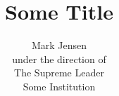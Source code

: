 \documentclass[cover.tex]{subfiles}
\begin{document}
\title{Some Title}
\author{Mark Jensen
	\vspace{0.5in}\\
	under the direction of\\
	The Supreme Leader\\
	Some Institution
	\vspace{1in}}
\end{document}
